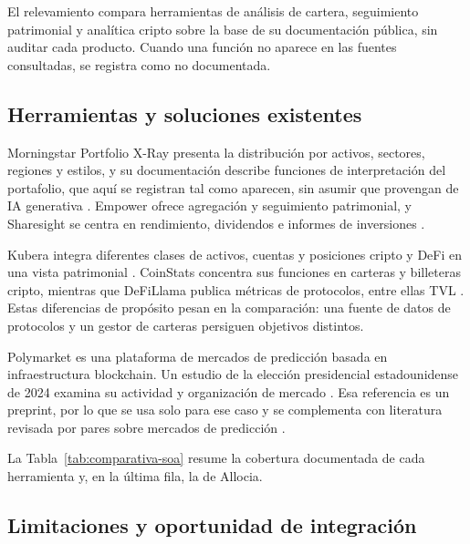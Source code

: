 El relevamiento compara herramientas de análisis de cartera, seguimiento patrimonial y analítica cripto sobre la base de su documentación pública, sin auditar cada producto. Cuando una función no aparece en las fuentes consultadas, se registra como no documentada.

\subsection{Herramientas y soluciones existentes}\label{sec:soluciones-existentes}

Morningstar Portfolio X-Ray presenta la distribución por activos, sectores, regiones y estilos, y su documentación describe funciones de interpretación del portafolio, que aquí se registran tal como aparecen, sin asumir que provengan de IA generativa \parencite{MorningstarXRay}. Empower ofrece agregación y seguimiento patrimonial, y Sharesight se centra en rendimiento, dividendos e informes de inversiones \parencite{EmpowerTools,SharesightFeatures}.

Kubera integra diferentes clases de activos, cuentas y posiciones cripto y DeFi en una vista patrimonial \parencite{KuberaFeatures}. CoinStats concentra sus funciones en carteras y billeteras cripto, mientras que DeFiLlama publica métricas de protocolos, entre ellas TVL \parencite{CoinStatsFeatures,DefiLlamaMethodology}. Estas diferencias de propósito pesan en la comparación: una fuente de datos de protocolos y un gestor de carteras persiguen objetivos distintos.

Polymarket es una plataforma de mercados de predicción basada en infraestructura blockchain. Un estudio de la elección presidencial estadounidense de 2024 examina su actividad y organización de mercado \parencite{TsangYang2026}. Esa referencia es un preprint, por lo que se usa solo para ese caso y se complementa con literatura revisada por pares sobre mercados de predicción \parencite{WolfersZitzewitz2004}.

La Tabla~\ref{tab:comparativa-soa} resume la cobertura documentada de cada herramienta y, en la última fila, la de Allocia.


\subsection{Limitaciones y oportunidad de integración}\label{sec:limitaciones-soluciones}

